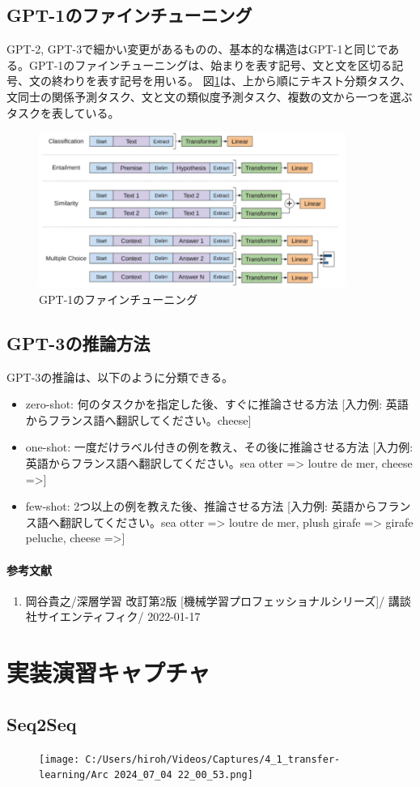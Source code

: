\documentclass{ltjsarticle}
\begin{document}
\subsection{GPT-1のファインチューニング}
GPT-2, GPT-3で細かい変更があるものの、基本的な構造はGPT-1と同じである。GPT-1のファインチューニングは、始まりを表す記号、文と文を区切る記号、文の終わりを表す記号を用いる。
図\ref{fig:GPT-1_fine_tuning}は、上から順にテキスト分類タスク、文同士の関係予測タスク、文と文の類似度予測タスク、複数の文から一つを選ぶタスクを表している。
\begin{figure}[htbp]
  \centering
  \includegraphics[width=10cm]{./capture/GPT-1_fine_tuning.png}
  \caption{GPT-1のファインチューニング}
  \label{fig:GPT-1_fine_tuning}
\end{figure}

\subsection{GPT-3の推論方法}
GPT-3の推論は、以下のように分類できる。
\begin{itemize}
  \item zero-shot: 何のタスクかを指定した後、すぐに推論させる方法 [入力例: 英語からフランス語へ翻訳してください。cheese]
  \item one-shot: 一度だけラベル付きの例を教え、その後に推論させる方法 [入力例: 英語からフランス語へ翻訳してください。sea otter => loutre de mer, cheese =>]
  \item few-shot: 2つ以上の例を教えた後、推論させる方法 [入力例: 英語からフランス語へ翻訳してください。sea otter => loutre de mer, plush girafe => girafe peluche, cheese =>]
\end{itemize}






\clearpage
\paragraph{参考文献}
\begin{enumerate}
  \item 岡谷貴之/深層学習 改訂第2版 [機械学習プロフェッショナルシリーズ]/ 講談社サイエンティフィク/ 2022-01-17
\end{enumerate}

\clearpage
\section{実装演習キャプチャ}
\subsection{Seq2Seq}
\begin{figure}[htbp]
  \centering
  \texttt{[image: C:/Users/hiroh/Videos/Captures/4\_1\_transfer-learning/Arc 2024\_07\_04 22\_00\_53.png]}
\end{figure}


\newpage
\end{document}
